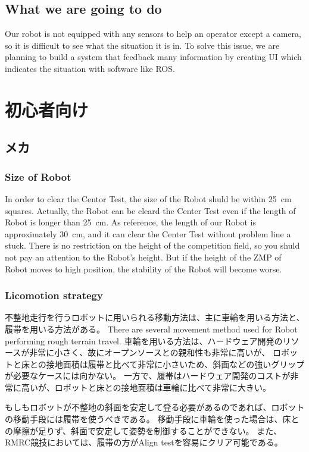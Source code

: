 \documentclass[journal]{IEEEtran}
\begin{document}
\subsection{What we are going to do}
Our robot is not equipped with any sensors to help an operator except a camera, so it is difficult to see what the situation it is in.
To solve this issue, we are planning to build a system that feedback many information by creating UI which indicates the situation with software like ROS.

\section{初心者向け}
\subsection{メカ}
\subsubsection{Size of Robot}
In order to clear the Centor Test, the size of the Robot shuld be within \SI{25}{\cm} squares.
Actually, the Robot can be cleard the Center Test even if the length of Robot is longer than \SI{25}{\cm}.
As reference, the length of our Robot is approximately \SI{30}{\cm}, and it can clear the Center Test without problem line a stuck.
There is no restriction on the height of the competition field, so you shuld not pay an attention to the Robot's height. But if the height of the ZMP of Robot moves to high position, the stability of the Robot will become worse.

\subsubsection{Licomotion strategy}
不整地走行を行うロボットに用いられる移動方法は、主に車輪を用いる方法と、履帯を用いる方法がある。
There are several movement method used for Robot performing rough terrain travel.
車輪を用いる方法は、ハードウェア開発のリソースが非常に小さく、故にオープンソースとの親和性も非常に高いが、
ロボットと床との接地面積は履帯と比べて非常に小さいため、斜面などの強いグリップが必要なケースには向かない。
一方で、履帯はハードウェア開発のコストが非常に高いが、ロボットと床との接地面積は車輪に比べて非常に大きい。

もしもロボットが不整地の斜面を安定して登る必要があるのであれば、ロボットの移動手段には履帯を使うべきである。
移動手段に車輪を使った場合は、床との摩擦が足りず、斜面で安定して姿勢を制御することができない。
また、RMRC競技においては、履帯の方がAlign testを容易にクリア可能である。
\end{document}
